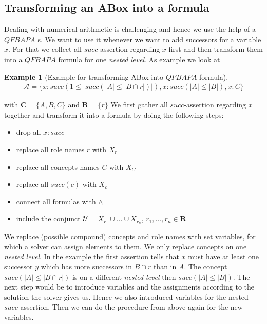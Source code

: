 \documentclass[a4paper,11pt]{scrartcl}
\theoremstyle{break}
\theoremstyle{definition}
\newtheorem{ex}{Example}
\begin{document}
\subsection{Transforming an ABox into a formula}
Dealing with numerical arithmetic is challenging and hence we use the help of a $QFBAPA$ s. We want to use it whenever we want to add successors for a variable $x$. For that we collect all $succ$-assertion regarding $x$ first and then transform them into a $QFBAPA$ formula for one \textit{nested level}. As example we look at
\begin{ex}[Example for transforming ABox into $QFBAPA$ formula]
\begin{align*}
\mathcal{A}=\{x:succ(1\leq|succ(|A|\leq|B\cap r|)|), x:succ(|A|\leq |B|), x:C\}
\end{align*}
\end{ex}
with $\mathbf{C}=\{A,B,C\}$ and $\mathbf{R}=\{r\}$
We first gather all $succ$-assertion regarding $x$ together and transform it into a formula by doing the following steps:
\begin{itemize}
\item drop all $x:succ$
\item replace all role names $r$ with $X_r$
\item replace all concepts names $C$ with $X_C$
\item replace all $succ(c)$ with $X_{c}$
\item connect all formulas with $\wedge$
\item include the conjunct $\mathcal{U}=X_{r_1}\cup\dots\cup X_{r_n}$, $r_1,\dots, r_n\in\mathbf{R}$
\end{itemize}
We replace (possible compound) concepts and role names with set variables, for which a solver can assign elements to them. We only replace concepts on one \textit{nested level}. In the example the first assertion tells that $x$ must have at least one successor $y$ which has more successors in $B\cap r$ than in $A$. The concept $succ(|A|\leq|B\cap r|)$ is on a different \textit{nested level} then $succ(|A|\leq |B|)$. The next step would be to introduce variables and the assignments according to the solution the solver gives us. Hence we also introduced variables for the nested $succ$-assertion. Then we can do the procedure from above again for the new variables.\\
\end{document}
